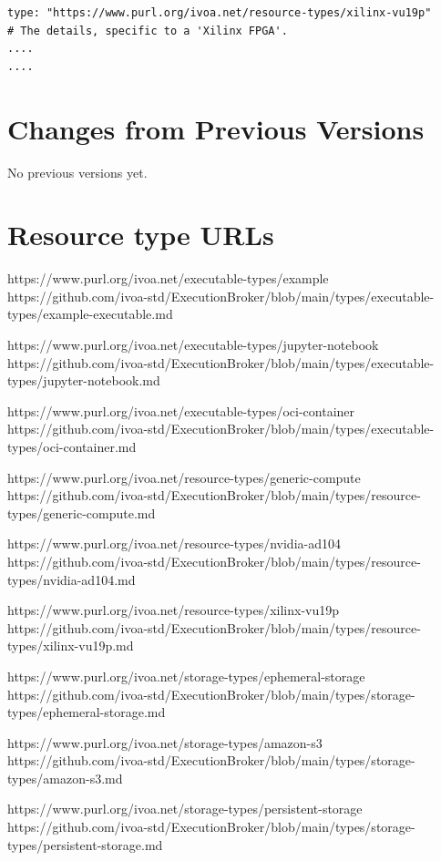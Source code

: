 \documentclass[11pt,a4paper]{ivoa}
\begin{document}
\begin{lstlisting}[]
type: "https://www.purl.org/ivoa.net/resource-types/xilinx-vu19p"
# The details, specific to a 'Xilinx FPGA'.
....
....
\end{lstlisting}


\pagebreak
\appendix
\section{Changes from Previous Versions}

No previous versions yet.

\pagebreak
\appendix
\section{Resource type URLs}


https://www.purl.org/ivoa.net/executable-types/example
https://github.com/ivoa-std/ExecutionBroker/blob/main/types/executable-types/example-executable.md

https://www.purl.org/ivoa.net/executable-types/jupyter-notebook
https://github.com/ivoa-std/ExecutionBroker/blob/main/types/executable-types/jupyter-notebook.md

https://www.purl.org/ivoa.net/executable-types/oci-container
https://github.com/ivoa-std/ExecutionBroker/blob/main/types/executable-types/oci-container.md

https://www.purl.org/ivoa.net/resource-types/generic-compute
https://github.com/ivoa-std/ExecutionBroker/blob/main/types/resource-types/generic-compute.md

https://www.purl.org/ivoa.net/resource-types/nvidia-ad104
https://github.com/ivoa-std/ExecutionBroker/blob/main/types/resource-types/nvidia-ad104.md

https://www.purl.org/ivoa.net/resource-types/xilinx-vu19p
https://github.com/ivoa-std/ExecutionBroker/blob/main/types/resource-types/xilinx-vu19p.md

https://www.purl.org/ivoa.net/storage-types/ephemeral-storage
https://github.com/ivoa-std/ExecutionBroker/blob/main/types/storage-types/ephemeral-storage.md

https://www.purl.org/ivoa.net/storage-types/amazon-s3
https://github.com/ivoa-std/ExecutionBroker/blob/main/types/storage-types/amazon-s3.md

https://www.purl.org/ivoa.net/storage-types/persistent-storage
https://github.com/ivoa-std/ExecutionBroker/blob/main/types/storage-types/persistent-storage.md
\end{document}
